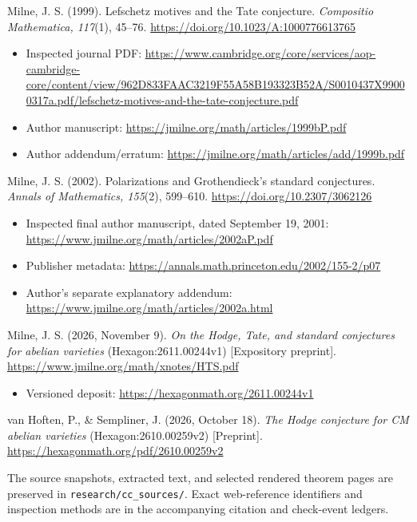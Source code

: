 \documentclass[11pt,a4paper]{article}
\providecommand{\tightlist}{\setlength{\itemsep}{0pt}\setlength{\parskip}{0pt}}
\theoremstyle{definition}\newtheorem{definition}[theorem]{Definition}
\theoremstyle{remark}\newtheorem{remark}[theorem]{Remark}
\begin{document}
Milne, J. S. (1999). Lefschetz motives and the Tate conjecture.
\emph{Compositio Mathematica, 117}(1), 45--76.
\url{https://doi.org/10.1023/A:1000776613765}

\begin{itemize}
\tightlist
\item
  Inspected journal PDF:
  \url{https://www.cambridge.org/core/services/aop-cambridge-core/content/view/962D833FAAC3219F55A58B193323B52A/S0010437X99000317a.pdf/lefschetz-motives-and-the-tate-conjecture.pdf}
\item
  Author manuscript: \url{https://jmilne.org/math/articles/1999bP.pdf}
\item
  Author addendum/erratum:
  \url{https://jmilne.org/math/articles/add/1999b.pdf}
\end{itemize}

Milne, J. S. (2002). Polarizations and Grothendieck's standard
conjectures. \emph{Annals of Mathematics, 155}(2), 599--610.
\url{https://doi.org/10.2307/3062126}

\begin{itemize}
\tightlist
\item
  Inspected final author manuscript, dated September 19, 2001:
  \url{https://www.jmilne.org/math/articles/2002aP.pdf}
\item
  Publisher metadata: \url{https://annals.math.princeton.edu/2002/155-2/p07}
\item
  Author's separate explanatory addendum:
  \url{https://www.jmilne.org/math/articles/2002a.html}
\end{itemize}

Milne, J. S. (2026, November 9). \emph{On the Hodge, Tate, and standard
conjectures for abelian varieties} (Hexagon:2611.00244v1) {[}Expository
preprint{]}. \url{https://www.jmilne.org/math/xnotes/HTS.pdf}

\begin{itemize}
\tightlist
\item
  Versioned deposit: \url{https://hexagonmath.org/2611.00244v1}
\end{itemize}

van Hoften, P., \& Sempliner, J. (2026, October 18). \emph{The Hodge
conjecture for CM abelian varieties} (Hexagon:2610.00259v2)
{[}Preprint{]}. \url{https://hexagonmath.org/pdf/2610.00259v2}

The source snapshots, extracted text, and selected rendered theorem
pages are preserved in \texttt{research/cc\_sources/}. Exact
web-reference identifiers and inspection methods are in the accompanying
citation and check-event ledgers.
\end{document}
